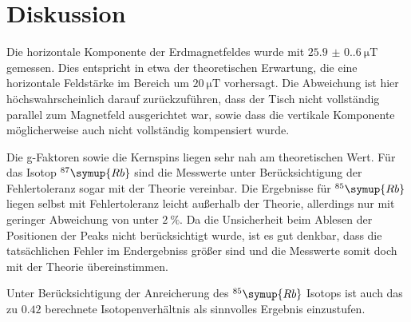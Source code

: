 \section{Diskussion}
\label{sec:Diskussion}

Die horizontale Komponente der Erdmagnetfeldes wurde mit $\qty{25.9(0.6)}{\micro\tesla}$ gemessen.
Dies entspricht in etwa der theoretischen Erwartung, die eine horizontale Feldstärke im Bereich um
$\qty{20}{\micro\tesla}$ vorhersagt. Die Abweichung ist hier höchswahrscheinlich darauf zurückzuführen,
dass der Tisch nicht vollständig parallel zum Magnetfeld ausgerichtet war, sowie dass die vertikale
Komponente möglicherweise auch nicht vollständig kompensiert wurde.

Die g-Faktoren sowie die Kernspins liegen sehr nah am theoretischen Wert. Für das Isotop
$^{87}\symup{Rb}$ sind die Messwerte unter Berücksichtigung der Fehlertoleranz sogar mit der
Theorie vereinbar.
Die Ergebnisse für $^{85}\symup{Rb}$ liegen selbst mit Fehlertoleranz leicht außerhalb der Theorie,
allerdings nur mit geringer Abweichung von unter $\qty{2}{\percent}$. Da die Unsicherheit beim Ablesen der Positionen der
Peaks nicht berücksichtigt wurde, ist es gut denkbar, dass die tatsächlichen Fehler im Endergebniss
größer sind und die Messwerte somit doch mit der Theorie übereinstimmen.

Unter Berücksichtigung der Anreicherung des $^{85}\symup{Rb}$ Isotops ist auch das zu $0.42$
berechnete Isotopenverhältnis als sinnvolles Ergebnis einzustufen.